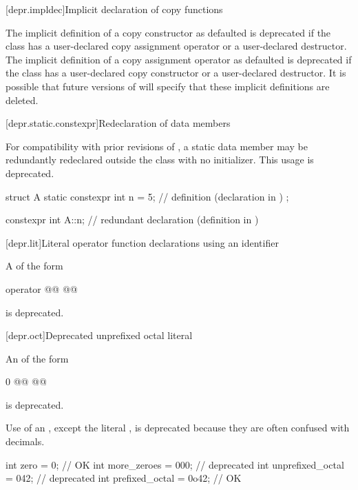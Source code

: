 [depr.impldec]{Implicit declaration of copy functions}

\pnum
The implicit definition of a copy constructor
as defaulted is deprecated if the class has
a user-declared copy assignment operator or
a user-declared destructor.
The implicit definition of a copy assignment operator
as defaulted is deprecated if the class has
a user-declared copy constructor or
a user-declared destructor.
It is possible that future versions of \Cpp{} will specify
that these implicit definitions are deleted.

[depr.static.constexpr]{Redeclaration of  data members}

\pnum
For compatibility with prior revisions of \Cpp{}, a 
static data member may be redundantly redeclared outside the class with no
initializer.
This usage is deprecated.
\begin{example}
\begin{codeblock}
struct A {
  static constexpr int n = 5;   // definition (declaration in \CppXIV{})
};

constexpr int A::n;             // redundant declaration (definition in \CppXIV{})
\end{codeblock}
\end{example}

[depr.lit]{Literal operator function declarations using an identifier}

\pnum
A  of the form
\begin{codeblock}
operator @@ @@
\end{codeblock}
is deprecated.

[depr.oct]{Deprecated unprefixed octal literal}

\pnum
An  of the form
\begin{codeblock}
0 @@ @@
\end{codeblock}
is deprecated.
\begin{note}
Use of an , except the literal ,
is deprecated because they are often confused with decimals.
\end{note}
\begin{example}
\begin{codeblock}
int zero = 0;               // OK
int more_zeroes = 000;      // deprecated
int unprefixed_octal = 042; // deprecated
int prefixed_octal = 0o42;  // OK
\end{codeblock}
\end{example}

